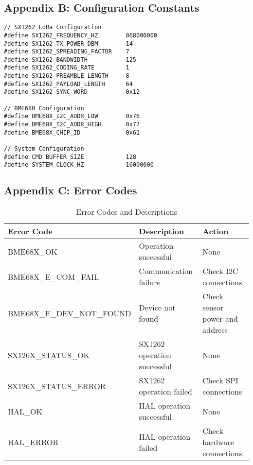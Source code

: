 \documentclass[11pt,a4paper]{article}
\begin{document}
\subsection{Appendix B: Configuration Constants}
\begin{lstlisting}[caption=Configuration Constants]
// SX1262 LoRa Configuration
#define SX1262_FREQUENCY_HZ        868000000
#define SX1262_TX_POWER_DBM        14
#define SX1262_SPREADING_FACTOR    7
#define SX1262_BANDWIDTH           125
#define SX1262_CODING_RATE         1
#define SX1262_PREAMBLE_LENGTH     8
#define SX1262_PAYLOAD_LENGTH      64
#define SX1262_SYNC_WORD           0x12

// BME680 Configuration
#define BME68X_I2C_ADDR_LOW        0x76
#define BME68X_I2C_ADDR_HIGH       0x77
#define BME68X_CHIP_ID             0x61

// System Configuration
#define CMD_BUFFER_SIZE            128
#define SYSTEM_CLOCK_HZ            16000000
\end{lstlisting}

\subsection{Appendix C: Error Codes}
\begin{table}[h]
\centering
\begin{tabular}{|l|l|l|}
\hline
\textbf{Error Code} & \textbf{Description} & \textbf{Action} \\
\hline
BME68X\_OK & Operation successful & None \\
\hline
BME68X\_E\_COM\_FAIL & Communication failure & Check I2C connections \\
\hline
BME68X\_E\_DEV\_NOT\_FOUND & Device not found & Check sensor power and address \\
\hline
SX126X\_STATUS\_OK & SX1262 operation successful & None \\
\hline
SX126X\_STATUS\_ERROR & SX1262 operation failed & Check SPI connections \\
\hline
HAL\_OK & HAL operation successful & None \\
\hline
HAL\_ERROR & HAL operation failed & Check hardware connections \\
\hline
\end{tabular}
\caption{Error Codes and Descriptions}
\end{table}
\end{document}
